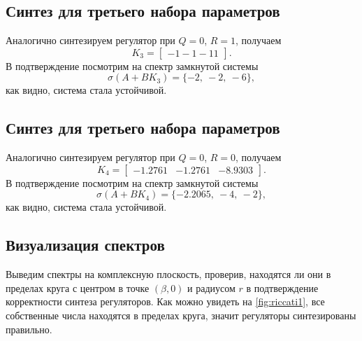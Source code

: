 \subsection{Синтез для третьего набора параметров}

Аналогично синтезируем регулятор при $Q=0$, $R=1$, получаем
\begin{equation*}
    K_3=\begin{bmatrix}
        -1 -1 -11
    \end{bmatrix}.
\end{equation*}
В подтверждение посмотрим на спектр замкнутой системы
\begin{equation*}
    \sigma(A+BK_3)=\{-2,\ -2,\ -6 \},
\end{equation*}
как видно, система стала устойчивой. 


\subsection{Синтез для третьего набора параметров}

Аналогично синтезируем регулятор при $Q=0$, $R=0$, получаем
\begin{equation*}
    K_4=\begin{bmatrix}
        -1.2761& -1.2761& -8.9303   
    \end{bmatrix}.
\end{equation*}
В подтверждение посмотрим на спектр замкнутой системы
\begin{equation*}
    \sigma(A+BK_4)=\{-2.2065,\ -4,\ -2\},
\end{equation*}
как видно, система стала устойчивой. 


\subsection{Визуализация спектров}

Выведим спектры на комплексную
плоскость, проверив, находятся ли они в пределах
круга с центром в точке $(\beta, 0)$ и радиусом $r$ в подтверждение 
корректности синтеза регуляторов. Как можно увидеть на \autoref{fig:riccati1},
все собственные числа находятся в пределах круга, значит регуляторы
синтезированы правильно.

